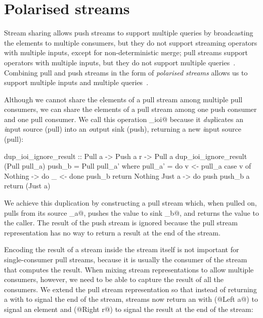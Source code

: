\section{Polarised streams}
\label{taxonomy/polarised}

Stream sharing allows push streams to support multiple queries by broadcasting the elements to multiple consumers, but they do not support streaming operators with multiple inputs, except for non-deterministic merge; pull streams support operators with multiple inputs, but they do not support multiple queries~\citep{kay2009you}.
Combining pull and push streams in the form of \emph{polarised streams} allows us to support multiple inputs and multiple queries~\citep{lippmeier2016polarized}.


Although we cannot share the elements of a pull stream among multiple pull consumers, we can share the elements of a pull stream among one push consumer and one pull consumer.
We call this operation \Hs@dup_ioi@ because it \emph{dup}licates an \emph{i}nput source (pull) into an \emph{o}utput sink (push), returning a new \emph{i}nput source (pull):

\begin{haskell}
dup_ioi_ignore_result :: Pull a -> Push a r -> Pull a
dup_ioi_ignore_result (Pull pull_a) push_b = Pull pull_a'
 where
  pull_a' = do
    v <- pull_a
    case v of
     Nothing -> do
      _ <- done push_b
      return Nothing
     Just a -> do
      push push_b a
      return (Just a)
\end{haskell}

We achieve this duplication by constructing a pull stream which, when pulled on, pulls from its source \Hs@pull_a@, pushes the value to sink \Hs@push_b@, and returns the value to the caller.
The result of the push stream is ignored because the pull stream representation has no way to return a result at the end of the stream.

Encoding the result of a stream inside the stream itself is not important for single-consumer pull streams, because it is usually the consumer of the stream that computes the result.
When mixing stream representations to allow multiple consumers, however, we need to be able to capture the result of all the consumers.
We extend the pull stream representation so that instead of returning a \Hs@Maybe@ with \Hs@Nothing@ to signal the end of the stream, streams now return an \Hs@Either@ with (@Left a@) to signal an element and (@Right r@) to signal the result at the end of the stream:

